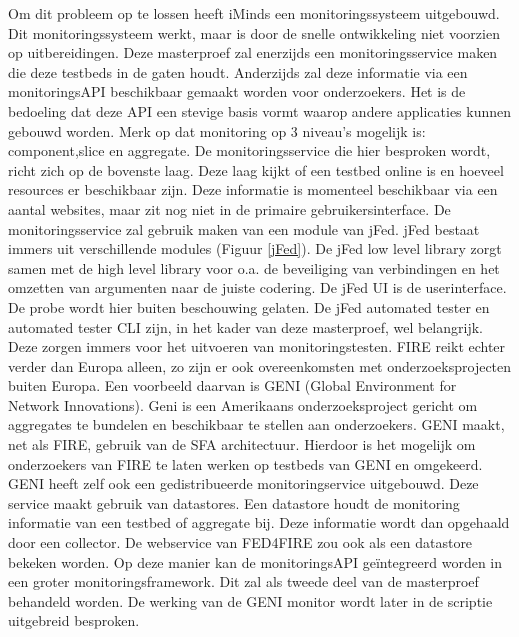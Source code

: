 \npar
Om dit probleem op te lossen heeft iMinds een monitoringssysteem uitgebouwd\citep{fed4fire-second-fed-arch}. Dit monitoringssysteem werkt, maar is door de snelle ontwikkeling niet voorzien op uitbereidingen. Deze masterproef zal enerzijds een monitoringsservice maken die deze testbeds in de gaten houdt. Anderzijds zal deze informatie via een monitoringsAPI beschikbaar gemaakt worden voor onderzoekers. Het is de bedoeling dat deze API een stevige basis vormt waarop andere applicaties kunnen gebouwd worden. Merk op dat monitoring op 3 niveau's mogelijk is: component,slice en aggregate. De monitoringsservice die hier besproken wordt, richt zich op de bovenste laag. Deze laag kijkt of een testbed online is en hoeveel resources er beschikbaar zijn. Deze informatie is momenteel beschikbaar via een aantal websites, maar zit nog niet in de primaire gebruikersinterface.
\npar
De monitoringsservice zal gebruik maken van een module van jFed.
jFed bestaat immers uit verschillende modules (Figuur \ref{jFed}).
De jFed low level library zorgt samen met de high level library voor o.a. de beveiliging van verbindingen en het omzetten van argumenten naar de juiste codering. De jFed UI is de userinterface. De probe wordt hier buiten beschouwing gelaten. De jFed automated tester en automated tester CLI zijn, in het kader van deze masterproef, wel belangrijk. Deze zorgen immers voor het uitvoeren van monitoringstesten.
\clearpage
\npar
FIRE reikt echter verder dan Europa alleen, zo zijn er ook overeenkomsten met onderzoeksprojecten buiten Europa. Een voorbeeld daarvan is GENI (Global Environment for Network Innovations). Geni is een Amerikaans onderzoeksproject gericht om aggregates te bundelen en beschikbaar te stellen aan onderzoekers\citep{geni-what-is}. GENI maakt, net als FIRE, gebruik van de SFA architectuur\citep{geni-sfa}. Hierdoor is het mogelijk om onderzoekers van FIRE te laten werken op testbeds van GENI en omgekeerd.
\npar
GENI heeft zelf ook een gedistribueerde monitoringservice uitgebouwd\citep{geni-monitor}. Deze service maakt gebruik van datastores\citep{geni-overview}. Een datastore houdt de monitoring informatie van een testbed of aggregate bij. Deze informatie wordt dan opgehaald door een collector. De webservice van FED4FIRE zou ook als een datastore bekeken worden. Op deze manier kan de monitoringsAPI geïntegreerd worden in een groter monitoringsframework. Dit zal als tweede deel van de masterproef behandeld worden. De werking van de GENI monitor wordt later in de scriptie uitgebreid besproken.